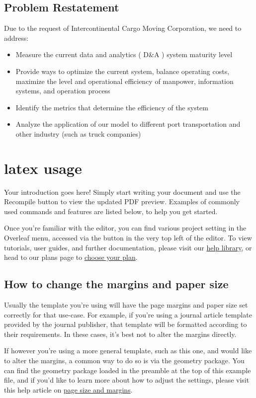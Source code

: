 \documentclass[12pt]{article}
\begin{document}
\subsection{Problem Restatement}
Due to the request of Intercontinental Cargo Moving Corporation, we need to address:
\begin{itemize}
    \item Measure the current data and analytics ( D\&A ) system maturity level
    \item Provide ways to optimize the current system, balance operating costs, maximize the level and operational efficiency of manpower, information systems, and operation process
    \item Identify the metrics that determine the efficiency of the system
    \item Analyze the application of our model to different port transportation and other industry (such as truck companies)
\end{itemize}

\section {latex usage}
Your introduction goes here! Simply start writing your document and use the Recompile button to view the updated PDF preview. Examples of commonly used commands and features are listed below, to help you get started.

Once you're familiar with the editor, you can find various project setting in the Overleaf menu, accessed via the button in the very top left of the editor. To view tutorials, user guides, and further documentation, please visit our \href{https://www.overleaf.com/learn}{help library}, or head to our plans page to \href{https://www.overleaf.com/user/subscription/plans}{choose your plan}.

\subsection{How to change the margins and paper size}

Usually the template you're using will have the page margins and paper size set correctly for that use-case. For example, if you're using a journal article template provided by the journal publisher, that template will be formatted according to their requirements. In these cases, it's best not to alter the margins directly.

If however you're using a more general template, such as this one, and would like to alter the margins, a common way to do so is via the geometry package. You can find the geometry package loaded in the preamble at the top of this example file, and if you'd like to learn more about how to adjust the settings, please visit this help article on \href{https://www.overleaf.com/learn/latex/page_size_and_margins}{page size and margins}.
\end{document}
